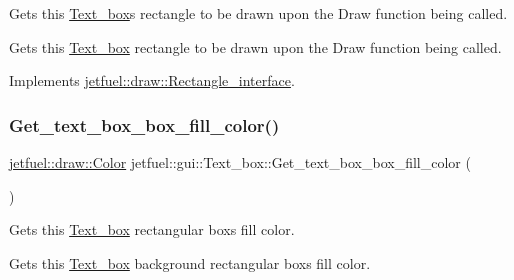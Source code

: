 Gets this \hyperlink{classjetfuel_1_1gui_1_1Text__box}{Text\+\_\+box}\textquotesingle{}s rectangle to be drawn upon the Draw function being called. 

Gets this \hyperlink{classjetfuel_1_1gui_1_1Text__box}{Text\+\_\+box} rectangle to be drawn upon the Draw function being called. 

Implements \hyperlink{classjetfuel_1_1draw_1_1Rectangle__interface_a03fd3b6842ab7b3065379caec407296f}{jetfuel\+::draw\+::\+Rectangle\+\_\+interface}.

\mbox{\label{classjetfuel_1_1gui_1_1Text__box_aca83661e45b31506a7cfe5ce686cacbd}} 
\subsubsection{\texorpdfstring{Get\+\_\+text\+\_\+box\+\_\+box\+\_\+fill\+\_\+color()}{Get\_text\_box\_box\_fill\_color()}}
{\footnotesize\ttfamily \hyperlink{classjetfuel_1_1draw_1_1Color}{jetfuel\+::draw\+::\+Color} jetfuel\+::gui\+::\+Text\+\_\+box\+::\+Get\+\_\+text\+\_\+box\+\_\+box\+\_\+fill\+\_\+color (\begin{DoxyParamCaption}{ }\end{DoxyParamCaption})\hspace{0.3cm}{\ttfamily [inline]}}



Gets this \hyperlink{classjetfuel_1_1gui_1_1Text__box}{Text\+\_\+box} rectangular box\textquotesingle{}s fill color. 

Gets this \hyperlink{classjetfuel_1_1gui_1_1Text__box}{Text\+\_\+box} background rectangular box\textquotesingle{}s fill color. \mbox{\label{classjetfuel_1_1gui_1_1Text__box_af052edf74fc28496f2d77e9d86b1c67a}} 
